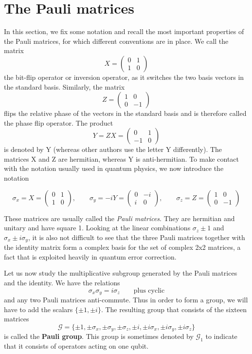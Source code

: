 \documentclass[a4paper, draft]{article}
\theoremstyle{own}
\theoremstyle{remark}
\begin{document}
\section{The Pauli matrices}

In this section, we fix some notation and recall the most important properties of the Pauli matrices, for which different conventions are in place. We call the matrix
$$
X = \begin{pmatrix} 0 & 1 \\ 1 & 0\end{pmatrix}
$$
the bit-flip operator or inversion operator, as it switches the two basis vectors in the standard basis. Similarly, the matrix
$$
Z = \begin{pmatrix} 1 & 0 \\ 0 & -1\end{pmatrix}
$$
flips the relative phase of the vectors in the standard basis and is therefore called the phase flip operator. The product
$$
Y = ZX = \begin{pmatrix} 0 & 1 \\ -1 & 0\end{pmatrix}
$$
is denoted by Y (whereas other authors use the letter Y differently). The matrices X and Z are hermitian, whereas Y is anti-hermitian. To make contact with the notation usually used in quantum physics, we now introduce the notation

$$
\sigma_x = X = \begin{pmatrix} 0 & 1 \\ 1 & 0 \end{pmatrix}, \qquad
\sigma_y = -iY = \begin{pmatrix} 0 & -i \\ i & 0 \end{pmatrix}, \qquad
\sigma_z = Z = \begin{pmatrix} 1 & 0 \\ 0 & -1 \end{pmatrix}
$$

These matrices are usually called the \emph{Pauli matrices}. They are hermitian and unitary and have square 1. Looking at the linear combinations $\sigma_z \pm 1$ and $\sigma_x \pm i \sigma_y$, it is also not difficult to see that the three Pauli matrices together with the identity matrix form a complex basis for the set of complex 2x2 matrices, a fact that is exploited heavily in quantum error correction. 

Let us now study the multiplicative subgroup generated by the Pauli matrices and the identity. We have the relations 
$$
\sigma_x \sigma_y = i \sigma_z \qquad \text{plus cyclic}
$$
and any two Pauli matrices anti-commute. Thus in order to form a group, we will have to add the scalars $\{\pm 1, \pm i\}$. The resulting group that consists of the sixteen matrices
$$
\mathcal{G} = \{
\pm 1, \pm \sigma_x, \pm \sigma_y, \pm \sigma_z, 
\pm i, \pm i \sigma_x, \pm i \sigma_y, \pm i \sigma_z 
\}          
$$
is called the {\bf Pauli group}. This group is sometimes denoted by $\mathcal{G}_1$ to indicate that it consists of operators acting on one qubit. 
\end{document}
